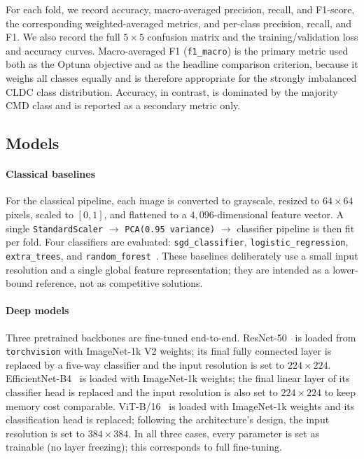 \documentclass[conference]{IEEEtran}
\begin{document}
For each fold, we record accuracy, macro-averaged precision, recall, and F1-score, the corresponding weighted-averaged metrics, and per-class precision, recall, and F1. We also record the full $5{\times}5$ confusion matrix and the training/validation loss and accuracy curves. Macro-averaged F1 (\texttt{f1\_macro}) is the primary metric used both as the Optuna objective and as the headline comparison criterion, because it weighs all classes equally and is therefore appropriate for the strongly imbalanced CLDC class distribution. Accuracy, in contrast, is dominated by the majority CMD class and is reported as a secondary metric only.

\subsection{Models}
\label{ssec:models}

\paragraph{Classical baselines}
For the classical pipeline, each image is converted to grayscale, resized to $64{\times}64$ pixels, scaled to $[0,1]$, and flattened to a $4{,}096$-dimensional feature vector. A single \texttt{StandardScaler} $\rightarrow$ \texttt{PCA(0.95 variance)} $\rightarrow$ classifier pipeline is then fit per fold. Four classifiers are evaluated: \texttt{sgd\_classifier}, \texttt{logistic\_regression}, \texttt{extra\_trees}, and \texttt{random\_forest}~\cite{breiman2001randomforests}. These baselines deliberately use a small input resolution and a single global feature representation; they are intended as a lower-bound reference, not as competitive solutions.

\paragraph{Deep models}
Three pretrained backbones are fine-tuned end-to-end. ResNet-50~\cite{he2016resnet} is loaded from \texttt{torchvision} with ImageNet-1k V2 weights; its final fully connected layer is replaced by a five-way classifier and the input resolution is set to $224{\times}224$. EfficientNet-B4~\cite{tan2019efficientnet} is loaded with ImageNet-1k weights; the final linear layer of its classifier head is replaced and the input resolution is also set to $224{\times}224$ to keep memory cost comparable. ViT-B/16~\cite{dosovitskiy2021vit} is loaded with ImageNet-1k weights and its classification head is replaced; following the architecture's design, the input resolution is set to $384{\times}384$. In all three cases, every parameter is set as trainable (no layer freezing); this corresponds to full fine-tuning.
\end{document}
